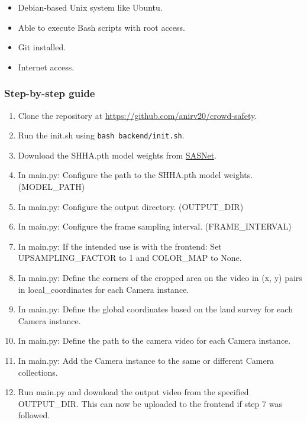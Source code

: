 \documentclass[
]{article}
\begin{document}
\begin{itemize}
\item
  Debian-based Unix system like Ubuntu.
\item
  Able to execute Bash scripts with root access.
\item
  Git installed.
\item
  Internet access.
\end{itemize}

\hypertarget{step-by-step-guide}{%
\subsubsection{Step-by-step guide}\label{step-by-step-guide}}

\begin{enumerate}
\def\labelenumi{\arabic{enumi}.}
\item
  Clone the repository at \url{https://github.com/anirv20/crowd-safety}.
\item
  Run the init.sh using \texttt{bash\ backend/init.sh}.
\item
  Download the SHHA.pth model weights from
  \href{https://drive.google.com/drive/folders/1uTkJLQOn-jQg81yNAluBpGpIJ-XaZaGI}{SASNet}.
\item
  In main.py: Configure the path to the SHHA.pth model weights.
  (MODEL\_PATH)
\item
  In main.py: Configure the output directory. (OUTPUT\_DIR)
\item
  In main.py: Configure the frame sampling interval. (FRAME\_INTERVAL)
\item
  In main.py: If the intended use is with the frontend: Set
  UPSAMPLING\_FACTOR to 1 and COLOR\_MAP to None.
\item
  In main.py: Define the corners of the cropped area on the video in (x,
  y) pairs in local\_coordinates for each Camera instance.
\item
  In main.py: Define the global coordinates based on the land survey for
  each Camera instance.
\item
  In main.py: Define the path to the camera video for each Camera
  instance.
\item
  In main.py: Add the Camera instance to the same or different Camera
  collections.
\item
  Run main.py and download the output video from the specified
  OUTPUT\_DIR. This can now be uploaded to the frontend if step 7 was
  followed.
\end{enumerate}
\end{document}
